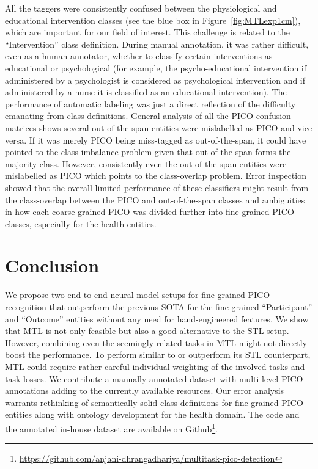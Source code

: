 \documentclass[runningheads]{llncs}
\begin{document}
All the taggers were consistently confused between the physiological and educational intervention classes (see the blue box in Figure~\ref{fig:MTLexp1cm}), which are important for our field of interest.
This challenge is related to the ``Intervention'' class definition.
During manual annotation, it was rather difficult, even as a human annotator, whether to classify certain interventions as educational or psychological (for example, the psycho-educational intervention if administered by a psychologist is considered as psychological intervention and if administered by a nurse it is classified as an educational intervention).
The performance of automatic labeling was just a direct reflection of the difficulty emanating from class definitions.
General analysis of all the PICO confusion matrices shows several out-of-the-span entities were mislabelled as PICO and vice versa.
If it was merely PICO being miss-tagged as out-of-the-span, it could have pointed to the class-imbalance problem given that out-of-the-span forms the majority class.
However, consistently even the out-of-the-span entities were mislabelled as PICO which points to the class-overlap problem.
Error inspection showed that the overall limited performance of these classifiers might result from the class-overlap between the PICO and out-of-the-span classes and ambiguities in how each coarse-grained PICO was divided further into fine-grained PICO classes, especially for the health entities.
%
\section{Conclusion}
\label{sec:conclusion}
%
We propose two end-to-end neural model setups for fine-grained PICO recognition that outperform the previous SOTA for the fine-grained ``Participant'' and ``Outcome'' entities without any need for hand-engineered features.
We show that MTL is not only feasible but also a good alternative to the STL setup.
However, combining even the seemingly related tasks in MTL might not directly boost the performance.
To perform similar to or outperform its STL counterpart, MTL could require rather careful individual weighting of the involved tasks and task losses.
We contribute a manually annotated dataset with multi-level PICO annotations adding to the currently available resources.
Our error analysis warrants rethinking of semantically solid class definitions for fine-grained PICO entities along with ontology development for the health domain.
The code and the annotated in-house dataset are available on Github\footnote{\url{https://github.com/anjani-dhrangadhariya/multitask-pico-detection}}.
%
%
%
%


%
\end{document}
